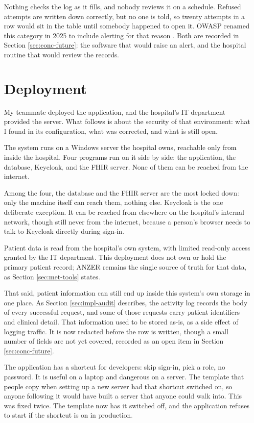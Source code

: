 Nothing checks the log as it fills, and nobody reviews it on a schedule. Refused attempts are written down correctly, but no one is told, so twenty attempts in a row would sit in the table until somebody happened to open it. OWASP renamed this category in 2025 to include alerting for that reason \cite{owasp2025}. Both are recorded in Section \ref{sec:conc-future}: the software that would raise an alert, and the hospital routine that would review the records.

\section{Deployment}
\label{sec:impl-deployment}

My teammate deployed the application, and the hospital's IT department provided the server. What follows is about the security of that environment: what I found in its configuration, what was corrected, and what is still open.

The system runs on a Windows server the hospital owns, reachable only from inside the hospital. Four programs run on it side by side: the application, the database, Keycloak, and the FHIR server. None of them can be reached from the internet.

Among the four, the database and the FHIR server are the most locked down: only the machine itself can reach them, nothing else. Keycloak is the one deliberate exception. It can be reached from elsewhere on the hospital's internal network, though still never from the internet, because a person's browser needs to talk to Keycloak directly during sign-in.

Patient data is read from the hospital's own system, with limited read-only access granted by the IT department. This deployment does not own or hold the primary patient record; ANZER remains the single source of truth for that data, as Section \ref{sec:met-tools} states.

That said, patient information can still end up inside this system's own storage in one place. As Section \ref{sec:impl-audit} describes, the activity log records the body of every successful request, and some of those requests carry patient identifiers and clinical detail. That information used to be stored as-is, as a side effect of logging traffic. It is now redacted before the row is written, though a small number of fields are not yet covered, recorded as an open item in Section \ref{sec:conc-future}.

The application has a shortcut for developers: skip sign-in, pick a role, no password. It is useful on a laptop and dangerous on a server. The template that people copy when setting up a new server had that shortcut switched on, so anyone following it would have built a server that anyone could walk into. This was fixed twice. The template now has it switched off, and the application refuses to start if the shortcut is on in production.

